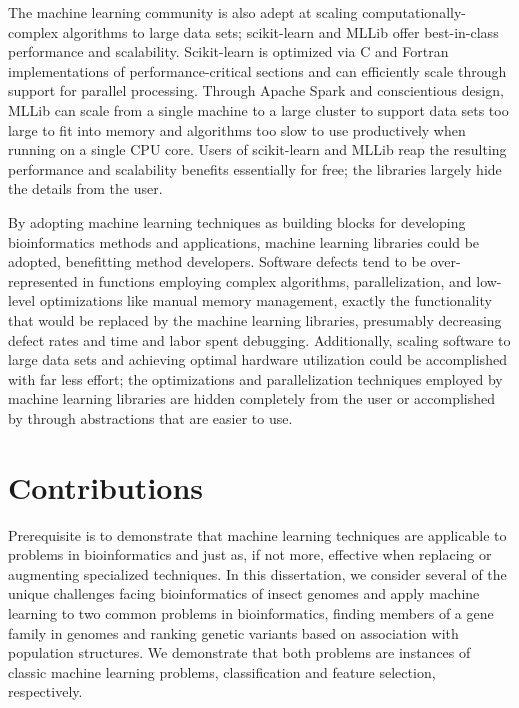 The machine learning community is also adept at scaling computationally-complex algorithms to large data sets; scikit-learn and MLLib offer best-in-class performance and scalability.  Scikit-learn is optimized via C and Fortran implementations of performance-critical sections and can efficiently scale through support for parallel processing.  Through Apache Spark and conscientious design, MLLib can scale from a single machine to a large cluster to support data sets too large to fit into memory and algorithms too slow to use productively when running on a single CPU core. Users of scikit-learn and MLLib reap the resulting performance and scalability benefits essentially for free; the libraries largely hide the details from the user.

By adopting machine learning techniques as building blocks for developing bioinformatics methods and applications, machine learning libraries could be adopted, benefitting method developers. Software defects tend to be over-represented in functions employing complex algorithms, parallelization, and low-level optimizations like manual memory management, exactly the functionality that would be replaced by the machine learning libraries, presumably decreasing defect rates and time and labor spent debugging. Additionally, scaling software to large data sets and achieving optimal hardware utilization could be accomplished with far less effort; the optimizations and parallelization techniques employed by machine learning libraries are hidden completely from the user or accomplished by through abstractions that are easier to use.

\section{Contributions}
Prerequisite is to demonstrate that machine learning techniques are applicable to problems in bioinformatics and just as, if not more, effective when replacing or augmenting specialized techniques.  In this dissertation, we consider several of the unique challenges facing bioinformatics of insect genomes and apply machine learning to two common problems in bioinformatics, finding members of a gene family in genomes and ranking genetic variants based on association with population structures.  We demonstrate that both problems are instances of classic machine learning problems, classification and feature selection, respectively.

